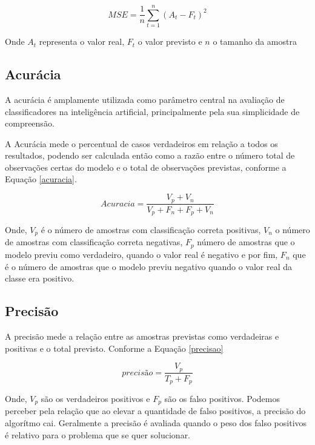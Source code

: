 \begin{equation}
\label{mse}
    MSE = \frac{1}{n} \sum_{t=1}^n  (A_t - F_t)^2
\end{equation}

Onde {$A_t$} representa o valor real, {$F_t$} o valor previsto e {$n$} o tamanho da amostra

\subsection{Acurácia}

A acurácia é amplamente utilizada como parâmetro central na avaliação de classificadores na inteligência artificial, principalmente pela sua simplicidade de compreensão.\cite{ma3}

A Acurácia mede o percentual de casos verdadeiros em relação a todos os resultados, podendo ser calculada então como a razão entre o número total de observações certas do modelo e o total de observações previstas, conforme a Equação \ref{acuracia}.

\begin{equation}
\label{acuracia}
    Acuracia = \frac{V_p + V_n}{V_p + F_n + F_p + V_n}
\end{equation}

Onde, {$V_p$} é o número de amostras com classificação correta positivas, {$V_n$} o número de amostras com classificação correta negativas, {$F_p$} número de amostras que o modelo previu como verdadeiro, quando o valor real é negativo e por fim, {$F_n$} que é o número de amostras que o modelo previu negativo quando o valor real da classe era positivo.

\subsection{Precisão}

A precisão mede a relação entre as amostras previstas como verdadeiras e positivas e o total previsto. Conforme a Equação \ref{precisao}

\begin{equation}
\label{precisao}
    precisão = \frac{V_p}{T_p + F_p}
\end{equation}

Onde, {$V_p$} são os verdadeiros positivos e {$F_p$} são os falso positivos. Podemos perceber pela relação que ao elevar a quantidade de falso positivos, a precisão do algorítmo cai. Geralmente a precisão é avaliada quando o peso dos falso positivos é relativo para o problema que se quer solucionar.

